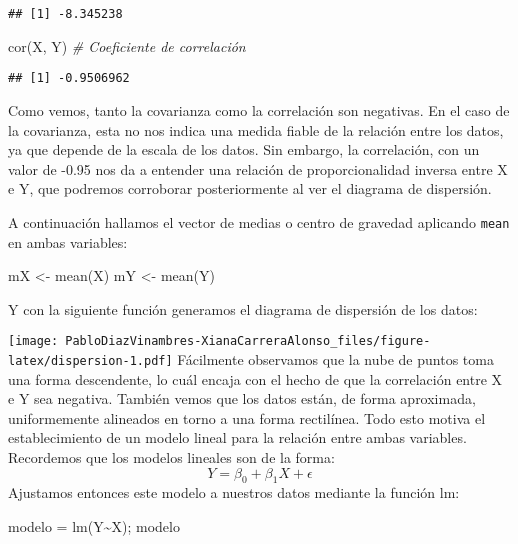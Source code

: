 \documentclass[
]{article}
\newenvironment{Shaded}{\begin{snugshade}}{\end{snugshade}}
\newcommand{\CommentTok}[1]{\textcolor[rgb]{0.56,0.35,0.01}{\textit{#1}}}
\newcommand{\FunctionTok}[1]{\textcolor[rgb]{0.00,0.00,0.00}{#1}}
\newcommand{\NormalTok}[1]{#1}
\newcommand{\OtherTok}[1]{\textcolor[rgb]{0.56,0.35,0.01}{#1}}
\newcommand{\SpecialCharTok}[1]{\textcolor[rgb]{0.00,0.00,0.00}{#1}}
\begin{document}
\begin{verbatim}
## [1] -8.345238
\end{verbatim}

\begin{Shaded}
\begin{Highlighting}[]
\FunctionTok{cor}\NormalTok{(X, Y)                                 }\CommentTok{\# Coeficiente de correlación}
\end{Highlighting}
\end{Shaded}

\begin{verbatim}
## [1] -0.9506962
\end{verbatim}

Como vemos, tanto la covarianza como la correlación son negativas. En el
caso de la covarianza, esta no nos indica una medida fiable de la
relación entre los datos, ya que depende de la escala de los datos. Sin
embargo, la correlación, con un valor de -0.95 nos da a entender una
relación de proporcionalidad inversa entre X e Y, que podremos
corroborar posteriormente al ver el diagrama de dispersión.

A continuación hallamos el vector de medias o centro de gravedad
aplicando \texttt{mean} en ambas variables:

\begin{Shaded}
\begin{Highlighting}[]
\NormalTok{mX }\OtherTok{\textless{}{-}} \FunctionTok{mean}\NormalTok{(X)}
\NormalTok{mY }\OtherTok{\textless{}{-}} \FunctionTok{mean}\NormalTok{(Y)}
\end{Highlighting}
\end{Shaded}

Y con la siguiente función generamos el diagrama de dispersión de los
datos:

\texttt{[image: PabloDiazVinambres-XianaCarreraAlonso\_files/figure-latex/dispersion-1.pdf]}
Fácilmente observamos que la nube de puntos toma una forma descendente,
lo cuál encaja con el hecho de que la correlación entre X e Y sea
negativa. También vemos que los datos están, de forma aproximada,
uniformemente alineados en torno a una forma rectilínea. Todo esto
motiva el establecimiento de un modelo lineal para la relación entre
ambas variables. Recordemos que los modelos lineales son de la forma: \[
Y = \beta_0 + \beta_1X + \epsilon
\] Ajustamos entonces este modelo a nuestros datos mediante la función
lm:

\begin{Shaded}
\begin{Highlighting}[]
\NormalTok{modelo }\OtherTok{=} \FunctionTok{lm}\NormalTok{(Y}\SpecialCharTok{\textasciitilde{}}\NormalTok{X); modelo}
\end{Highlighting}
\end{Shaded}
\end{document}
